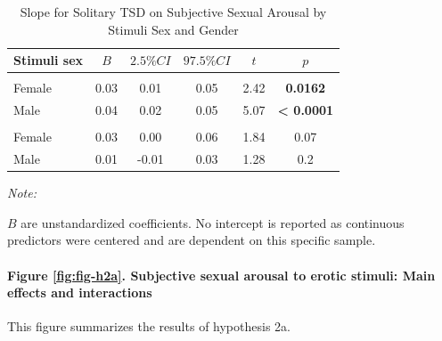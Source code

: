 \documentclass[
  bookmarksnumbered]{article}
\begin{document}
\begin{table}[H]
\centering
\caption{\label{tab:unnamed-chunk-21}Slope for Solitary TSD on Subjective Sexual Arousal by Stimuli Sex and Gender}
\centering
\begin{threeparttable}
\begin{tabular}[t]{lccccc}
\toprule
Stimuli sex & $B$ & $2.5\% CI$ & $97.5\% CI$ & $t$ & $p$\\
\midrule
\addlinespace[0.3em]
\multicolumn{6}{l}{\cellcolor{lightgray}{Gender: Women}}\\
\hspace{1em}Female & 0.03 & 0.01 & 0.05 & 2.42 & \textbf{0.0162}\\
\hspace{1em}Male & 0.04 & 0.02 & 0.05 & 5.07 & \textbf{< 0.0001}\\
\addlinespace[0.3em]
\multicolumn{6}{l}{\cellcolor{lightgray}{Gender: Men}}\\
\hspace{1em}Female & 0.03 & 0.00 & 0.06 & 1.84 & 0.07\\
\hspace{1em}Male & 0.01 & -0.01 & 0.03 & 1.28 & 0.2\\
\bottomrule
\end{tabular}
\begin{tablenotes}[para]
\item \textit{Note: } 
\item $B$ are unstandardized coefficients.
    No intercept is reported as continuous predictors were centered
    and are dependent on this specific sample.
\end{tablenotes}
\end{threeparttable}
\end{table}

\paragraph{Figure \ref{fig:fig-h2a}. Subjective sexual arousal to erotic stimuli: Main effects and interactions}\label{figure-reffigfig-h2a.-subjective-sexual-arousal-to-erotic-stimuli-main-effects-and-interactions}

This figure summarizes the results of hypothesis 2a.
\end{document}
